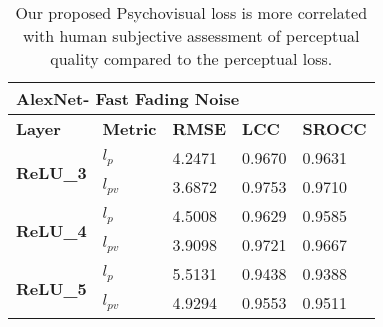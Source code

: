 \documentclass[10pt,twocolumn,letterpaper]{article}
\begin{document}
\begin{table}[]
\caption{Our proposed Psychovisual loss is more correlated with human subjective assessment of perceptual quality compared to the perceptual loss.}
\begin{tabular}{|l|l|l|l|l|}
\hline
\multicolumn{5}{|l|}{\textbf{AlexNet- Fast Fading Noise}}                                           \\ \hline
\textbf{Layer}                    & \textbf{Metric} & \textbf{RMSE} & \textbf{LCC} & \textbf{SROCC} \\ \hline
\multirow{2}{*}{\textbf{ReLU\_3}} & \textbf{$l_{p}$}              & 4.2471        & 0.9670       & 0.9631         \\ \cline{2-5} 
                                  & \textbf{$l_{pv}$}             & 3.6872        & 0.9753       & 0.9710         \\ \hline
\multirow{2}{*}{\textbf{ReLU\_4}} & \textbf{$l_{p}$}              & 4.5008        & 0.9629       & 0.9585         \\ \cline{2-5} 
                                  & \textbf{$l_{pv}$}             & 3.9098        & 0.9721       & 0.9667         \\ \hline
\multirow{2}{*}{\textbf{ReLU\_5}} & \textbf{$l_{p}$}              & 5.5131        & 0.9438       & 0.9388         \\ \cline{2-5} 
                                  & \textbf{$l_{pv}$}            & 4.9294        & 0.9553       & 0.9511         \\ \hline
\end{tabular}
\end{table}
\end{document}
